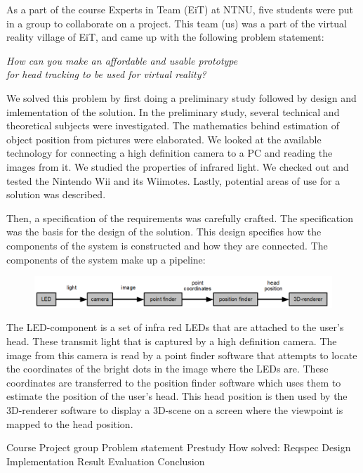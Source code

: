 As a part of the course Experts in Team (EiT) at NTNU, five students were put in a group to collaborate on a project. This team (us) was a part of the virtual reality village of EiT, and came up with the following problem statement:

\begin{center}\em How can you make an affordable and usable prototype\\for head tracking to be used for virtual reality?\end{center}
\vspace{\parskip}

We solved this problem by first doing a preliminary study followed by design and imlementation of the solution. In the preliminary study, several technical and theoretical subjects were investigated. The mathematics behind estimation of object position from pictures were elaborated. We looked at the available technology for connecting a high definition camera to a PC and reading the images from it. We studied the properties of infrared light. We checked out and tested the Nintendo Wii and its Wiimotes. Lastly, potential areas of use for a solution was described.

Then, a specification of the requirements was carefully crafted. The specification was the basis for the design of the solution. This design specifies how the components of the system is constructed and how they are connected. The components of the system make up a pipeline:

\begin{figure}[h]
\centering
\includegraphics[width=\textwidth]{graphics/main_design_english.png}
\end{figure}

The LED-component is a set of infra red LEDs that are attached to the user's head. These transmit light that is captured by a high definition camera. The image from this camera is read by a point finder software that attempts to locate the coordinates of the bright dots in the image where the LEDs are. These coordinates are transferred to the position finder software which uses them to estimate the position of the user's head. This head position is then used by the 3D-renderer software to display a 3D-scene on a screen where the viewpoint is mapped to the head position.

Course
Project group
Problem statement
Prestudy
How solved:
	Reqspec
	Design
	Implementation
Result
Evaluation
Conclusion
